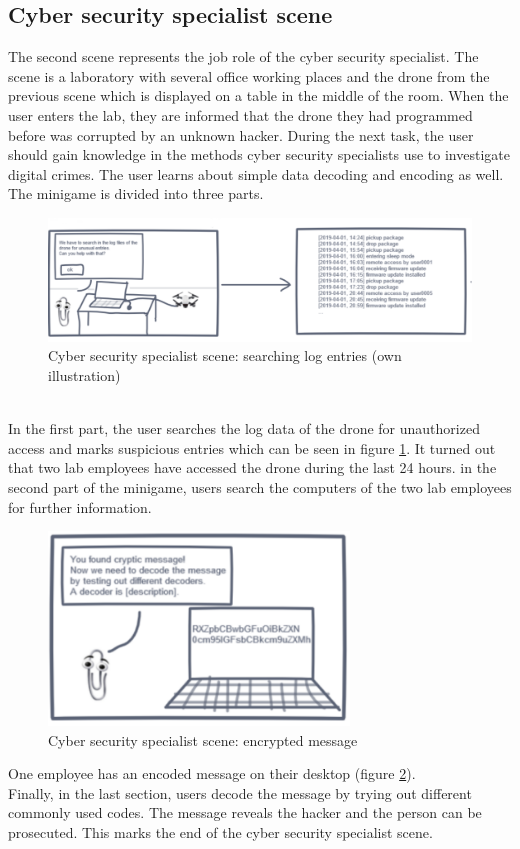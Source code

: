 \subsection{Cyber security specialist scene} 
The second scene represents the job role of the cyber security specialist. The scene is a laboratory with several office working places and the drone from the previous scene which is displayed on a table in the middle of the room. When the user enters the lab, they are informed that the drone they had programmed before was corrupted by an unknown hacker. During the next task, the user should gain knowledge in the methods cyber security specialists use to investigate digital crimes. The user learns about simple data decoding and encoding as well. The minigame is divided into three parts. 
\begin{figure}[h!]
  \includegraphics[width=16cm]{kapitel/storyboard/cyber-analyst1.pdf}
  \centering
  \caption{Cyber security specialist scene: searching log entries (own illustration)}
  \label{fig:logscene}
\end{figure}
\\In the first part, the user searches the log data of the drone for unauthorized access and marks suspicious entries which can be seen in figure \ref{fig:logscene}. It turned out that two lab employees have accessed the drone during the last 24 hours. in the second part of the minigame, users search the computers of the two lab employees for further information. 
\begin{figure}[h!]
  \includegraphics[width=8cm]{kapitel/storyboard/cyber-analyst3.pdf}
  \centering
  \caption{Cyber security specialist scene: encrypted message}
  \label{fig:logscene2}
\end{figure}
One employee has an encoded message on their desktop (figure \ref{fig:logscene2}).\\ Finally, in the last section, users decode the message by trying out different commonly used codes. The message reveals the hacker and the person can be prosecuted. This marks the end of the cyber security specialist scene.

